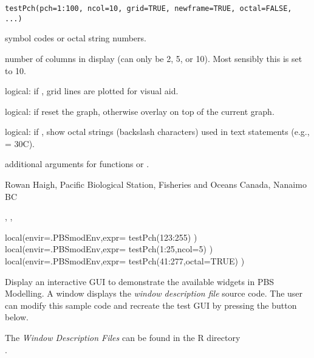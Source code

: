 \documentclass[letterpaper]{book}
\begin{document}
%
\begin{Usage}
\begin{verbatim}
testPch(pch=1:100, ncol=10, grid=TRUE, newframe=TRUE, octal=FALSE, ...)
\end{verbatim}
\end{Usage}
%
\begin{Arguments}
\begin{ldescription}
\item[\code{pch}] symbol codes or octal string numbers.
\item[\code{ncol}] number of columns in display (can only be 2, 5, or 10). Most 
sensibly this is set to 10.
\item[\code{grid}] logical: if , grid lines are plotted for visual aid.
\item[\code{newframe}] logical: if  reset the graph, otherwise overlay 
on top of the current graph.
\item[\code{octal}] logical: if , show octal strings (backslash characters) used in text 
statements (e.g.,  = 30\eqn{^\circ}{}C).
\item[\code{...}] additional arguments for functions  or .
\end{ldescription}
\end{Arguments}
%
\begin{Author}\relax
Rowan Haigh, Pacific Biological Station, Fisheries and Oceans Canada, Nanaimo BC
\end{Author}
%
\begin{SeeAlso}\relax
{}, , 
\end{SeeAlso}
%
\begin{Examples}
\begin{ExampleCode}
local(envir=.PBSmodEnv,expr={
  testPch(123:255)
})
local(envir=.PBSmodEnv,expr={
  testPch(1:25,ncol=5)
})
local(envir=.PBSmodEnv,expr={
  testPch(41:277,octal=TRUE)
})
\end{ExampleCode}
\end{Examples}
%
\begin{Description}\relax
Display an interactive GUI to demonstrate the available widgets in PBS Modelling.
A  window displays the \emph{window description file} source code. The user
can modify this sample code and recreate the test GUI by pressing the button below.

The \emph{Window Description Files} can be found in the R directory \\{}
.
\end{Description}
\end{document}
